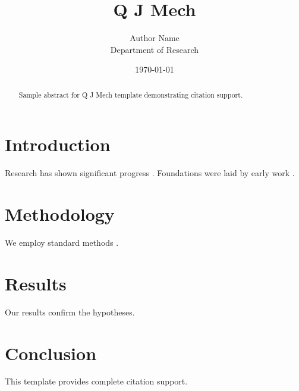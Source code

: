 \documentclass{jfm}
\title{Q J Mech}
\author{Author Name \\ \small Department of Research}
\date{\today}
\begin{document}
\maketitle

\begin{abstract}
Sample abstract for Q J Mech template demonstrating citation support.
\end{abstract}

\section{Introduction}
Research has shown significant progress \citep{einstein1905}. Foundations were laid by early work \citep{turing1950}.

\section{Methodology}
We employ standard methods \citep{knuth1984}.

\section{Results}
Our results confirm the hypotheses.

\section{Conclusion}
This template provides complete citation support.



\end{document}

